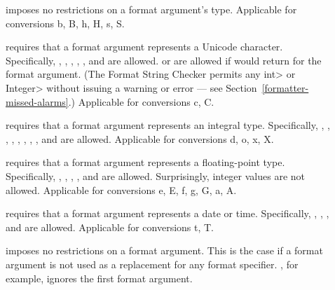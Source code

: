 \begin{description}
\item[] imposes no restrictions on a format argument's type. Applicable for
    conversions b, B, h, H, s, S.

\item[] requires that a format argument represents a Unicode character.
    Specifically, , , ,
    , , and  are allowed.
     or  are allowed if
     would return 
    for the format argument. (The Format String Checker permits any \<int>
    or \<Integer> without issuing a warning or error --- see
    Section~\ref{formatter-missed-alarms}.)
    Applicable for conversions c, C.

\item[] requires that a format argument represents an integral type. Specifically,
    , , , ,
    , , ,
    , and  are allowed. Applicable for
    conversions d, o, x, X.

\item[] requires that a format argument represents a floating-point type.  Specifically,
    , , ,
    , and  are allowed. Surprisingly, integer
    values are not allowed. Applicable for
    conversions e, E, f, g, G, a, A.

\item[] requires that a format argument represents a date or time.
    Specifically, , , , and
     are allowed.  Applicable for conversions t, T.

\item[] imposes no restrictions on a format argument. This is the case if a
    format argument is not used as a replacement for any format specifier.
    , for example, ignores the first format argument.
\end{description}

